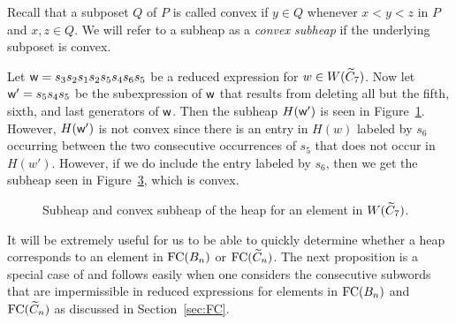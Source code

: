 Recall that a subposet $Q$ of $P$ is called convex if $y \in Q$ whenever $x< y<z$ in $P$ and $x,z \in Q$. We will refer to a subheap as a \emph{convex subheap} if the underlying subposet is convex.

\begin{example}
Let $\mathsf{w}=s_3s_2s_1s_2s_5s_4s_6s_5$ be a reduced expression for $w \in W(\widetilde{C}_7)$. Now let $\mathsf{w}'=s_5s_4s_5$ be the subexpression of $\mathsf{w}$ that results from deleting all but the fifth, sixth, and last generators of $\mathsf{w}$. Then the subheap $H(\mathsf{w}')$ is seen in Figure~\ref{fig:subheap}. However, $H(\mathsf{w}')$ is not convex since there is an entry in $H(w)$ labeled by $s_6$ occurring between the two consecutive occurrences of $s_5$ that does not occur in $H(w')$. However, if we do include the entry labeled by $s_6$, then we get the subheap seen in Figure~\ref{fig:convex}, which is convex.

\begin{figure}[h]
\centering
\begin{subfigure}[b]{0.3\textwidth}	
\centering
{}
\caption{}\label{fig:subheap}
\end{subfigure}
\begin{subfigure}[b]{0.3\textwidth}	
\centering
{}
\caption{}\label{fig:convex}
\end{subfigure}
\caption{Subheap and convex subheap of the heap for an element in $W(\widetilde{C}_7)$.}	
\end{figure}
\end{example}


It will be extremely useful for us to be able to quickly determine whether a heap corresponds to an element in $\mathrm{FC}(B_n)$ or $\mathrm{FC}(\widetilde{C}_n)$. The next proposition is a special case of \cite[Proposition 3.3]{Stembridge1996} and follows easily when one considers the consecutive subwords that are impermissible in reduced expressions for elements in $\mathrm{FC}(B_n)$ and $\mathrm{FC}(\widetilde{C}_n)$ as discussed in Section~\ref{sec:FC}.

